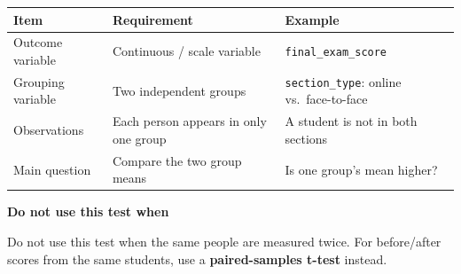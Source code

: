 \documentclass[
  letterpaper,
  DIV=11,
  numbers=noendperiod]{scrreprt}
\newcounter{none} %
\begin{document}
{\def\LTcaptype{none} %
\begin{longtable}[]{@{}
  >{\raggedright\arraybackslash}p{}
  >{\raggedright\arraybackslash}p{}
  >{\raggedright\arraybackslash}p{}@{}}
\toprule\noalign{}
\begin{minipage}[b]{\linewidth}\raggedright
Item
\end{minipage} & \begin{minipage}[b]{\linewidth}\raggedright
Requirement
\end{minipage} & \begin{minipage}[b]{\linewidth}\raggedright
Example
\end{minipage} \\
\midrule\noalign{}
\endhead
\bottomrule\noalign{}
\endlastfoot
Outcome variable & Continuous / scale variable &
\texttt{final\_exam\_score} \\
Grouping variable & Two independent groups & \texttt{section\_type}:
online vs.~face-to-face \\
Observations & Each person appears in only one group & A student is not
in both sections \\
Main question & Compare the two group means & Is one group's mean
higher? \\
\end{longtable}
}

\begin{tcolorbox}[enhanced jigsaw, arc=.35mm, bottomrule=.15mm, breakable, colback=white, colframe=quarto-callout-warning-color-frame, left=2mm, leftrule=.75mm, opacityback=0, rightrule=.15mm, toprule=.15mm]
\begin{minipage}[t]{5.5mm}
\textcolor{quarto-callout-warning-color}{\faExclamationTriangle}
\end{minipage}%
\begin{minipage}[t]{\textwidth - 5.5mm}

\vspace{-3mm}\textbf{Do not use this test when}\vspace{3mm}

Do not use this test when the same people are measured twice. For
before/after scores from the same students, use a \textbf{paired-samples
t-test} instead.

\end{minipage}%
\end{tcolorbox}
\end{document}
